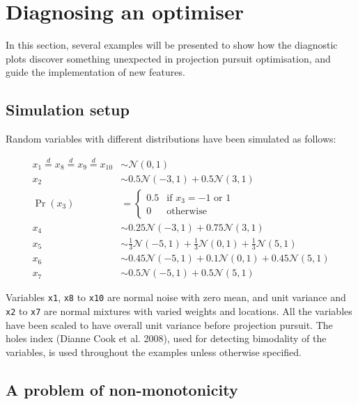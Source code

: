 \hypertarget{application}{%
\section{Diagnosing an optimiser}\label{application}}

In this section, several examples will be presented to show how the diagnostic plots discover something unexpected in projection pursuit optimisation, and guide the implementation of new features.

\hypertarget{simulation-setup}{%
\subsection{Simulation setup}\label{simulation-setup}}

Random variables with different distributions have been simulated as follows:

\begin{align}
x_1 \overset{d}{=} x_8 \overset{d}{=} x_9 \overset{d}{=} x_{10}& \sim \mathcal{N}(0, 1) \\
x_2 &\sim 0.5 \mathcal{N}(-3, 1) + 0.5 \mathcal{N}(3, 1)\\
\Pr(x_3) &= 
\begin{cases}
0.5 & \text{if $x_3 = -1$ or $1$}\\
0 & \text{otherwise}
\end{cases}\\
x_4 &\sim 0.25 \mathcal{N}(-3, 1) + 0.75 \mathcal{N}(3, 1)\\
x_5 &\sim \frac{1}{3} \mathcal{N}(-5, 1) + \frac{1}{3} \mathcal{N}(0, 1) + \frac{1}{3} \mathcal{N}(5, 1)\\
x_6 &\sim 0.45 \mathcal{N}(-5, 1) + 0.1 \mathcal{N}(0, 1) + 0.45 \mathcal{N}(5, 1)\\
x_7 &\sim 0.5 \mathcal{N}(-5, 1) + 0.5 \mathcal{N}(5, 1) 
\end{align}

\noindent Variables \texttt{x1}, \texttt{x8} to \texttt{x10} are normal noise with zero mean, and unit variance and \texttt{x2} to \texttt{x7} are normal mixtures with varied weights and locations. All the variables have been scaled to have overall unit variance before projection pursuit. The holes index (Dianne Cook et al. 2008), used for detecting bimodality of the variables, is used throughout the examples unless otherwise specified.

\hypertarget{monotonic}{%
\subsection{A problem of non-monotonicity}\label{monotonic}}

